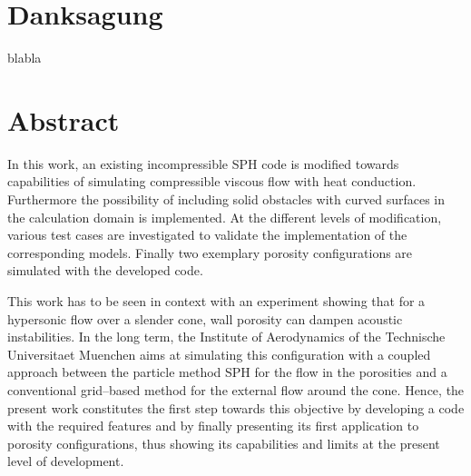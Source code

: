 \documentclass[11pt,a4paper,twoside]{report}
\begin{document}
\pagestyle{fancyplain}


\renewcommand{\sectionmark}[1]{\markright{#1}{}}
\renewcommand{\chaptermark}[1]{\markboth{#1}{}}
 


\pagestyle{empty}
\newpage
\cleardoublepage


 \setcounter{page}{3}

\clearpage
\chapter*{Danksagung}
blabla
\mdseries
\cleardoublepage

\chapter*{Abstract}


In this work, an existing incompressible SPH code is modified towards capabilities of simulating compressible viscous flow with heat conduction. Furthermore the possibility of including solid obstacles with curved surfaces in the calculation domain is implemented. At the different levels of modification, various test cases are investigated to validate the implementation of the corresponding models. Finally two exemplary porosity configurations are simulated with the developed code.

This work has to be seen in context with an experiment showing that for a hypersonic flow over a slender cone, wall porosity can dampen acoustic instabilities. In the long
term, the Institute of Aerodynamics of the Technische Universitaet Muenchen aims at simulating this configuration with a coupled approach between the particle method SPH for the flow in the porosities and a conventional grid--based method for the external flow around the cone. Hence, the present work constitutes the first step towards this objective by developing a code with the required features and by finally presenting its first application to porosity configurations, thus showing its capabilities and limits at the present level of development.

\cleardoublepage %

\fancyhf{}
\cfoot{}
\end{document}
